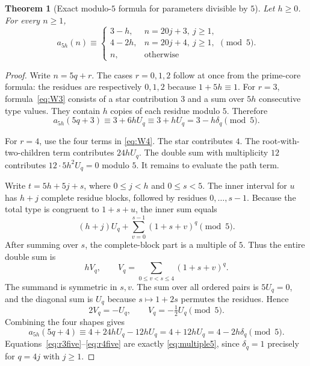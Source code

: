 \documentclass[11pt,letterpaper]{article}
\newtheorem{theorem}{Theorem}[section]
\theoremstyle{definition}
\theoremstyle{remark}
\begin{document}
\begin{theorem}[Exact modulo-$5$ formula for parameters divisible by $5$]
\label{thm:multiple5}
Let $h\ge0$. For every $n\ge1$,
\begin{equation}\label{eq:multiple5}
 a_{5h}(n)\equiv
 \begin{cases}
 3-h,&n=20j+3,\ j\ge1,\\
 4-2h,&n=20j+4,\ j\ge1,\\
 n,&\text{otherwise}
 \end{cases}\pmod5.
\end{equation}
\end{theorem}
\begin{proof}
Write $n=5q+r$. The cases $r=0,1,2$ follow at once from the prime-core
formula: the residues are respectively $0,1,2$ because $1+5h\equiv1$.
For $r=3$, formula~\eqref{eq:W3} consists of a star contribution $3$
and a sum over $5h$ consecutive type values. They contain $h$ copies of
each residue modulo $5$. Therefore
\begin{equation}\label{eq:r3five}
 a_{5h}(5q+3)\equiv3+6hU_q\equiv3+hU_q=3-h\delta_q\pmod5.
\end{equation}

For $r=4$, use the four terms in \eqref{eq:W4}. The star contributes $4$.
The root-with-two-children term contributes $24hU_q$. The double sum
with multiplicity $12$ contributes $12\cdot5h^2U_q=0$ modulo $5$.
It remains to evaluate the path term.

Write $t=5h+5j+s$, where $0\le j<h$ and $0\le s<5$. The inner interval
for $u$ has $h+j$ complete residue blocks, followed by residues
$0,\ldots,s-1$. Because the total type is congruent to $1+s+u$, the
inner sum equals
\[
 (h+j)U_q+\sum_{v=0}^{s-1}(1+s+v)^q\pmod5.
\]
After summing over $s$, the complete-block part is a multiple of $5$.
Thus the entire double sum is
\[
 hV_q,\qquad
 V_q=\sum_{0\le v<s\le4}(1+s+v)^q.
\]
The summand is symmetric in $s,v$. The sum over all ordered pairs is
$5U_q=0$, and the diagonal sum is $U_q$ because $s\mapsto1+2s$ permutes
the residues. Hence
\[
 2V_q=-U_q,\qquad V_q=-\tfrac12U_q\pmod5.
\]
Combining the four shapes gives
\begin{equation}\label{eq:r4five}
 a_{5h}(5q+4)\equiv4+24hU_q-12hU_q
 =4+12hU_q=4-2h\delta_q\pmod5.
\end{equation}
Equations~\eqref{eq:r3five}--\eqref{eq:r4five} are exactly
\eqref{eq:multiple5}, since $\delta_q=1$ precisely for $q=4j$ with $j\ge1$.
\end{proof}
\end{document}
